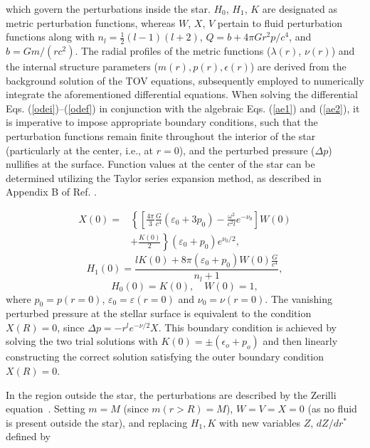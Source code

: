 \documentclass[aps,prd,twocolumn,superscriptaddress,footinbib]{revtex4-1}
\begin{document}
which govern the perturbations inside the star.  $H_0$, $H_1$, $K$ are designated as metric perturbation functions, whereas $W$, $X$, $V$ pertain to fluid perturbation functions along with $n_l= \frac{1}{2}\left(l-1\right)\left(l+2\right)$, $Q = b + 4 \pi G r^2 p/c^4$, and $b = G m/(r c^2)$. The radial profiles of the metric functions ($\lambda(r)$, $\nu(r)$) and the internal structure parameters ($m(r),p(r),\epsilon(r)$) are derived from the background solution of the TOV equations, subsequently employed to numerically integrate the aforementioned differential equations. When solving the differential Eqs. (\ref{odei})–(\ref{odef}) in conjunction with the algebraic Eqs. (\ref{ae1}) and (\ref{ae2}), it is imperative to impose appropriate boundary conditions, such that the perturbation functions remain finite throughout the interior of the star (particularly at the center, i.e., at \( r = 0 \)), and the perturbed pressure (\(\Delta p\)) nullifies at the surface. Function values at the center of the star can be determined utilizing the Taylor series expansion method, as described in Appendix B of Ref. \cite{lindblom1983quadrupole}.

\begin{equation}
\begin{aligned}
X(0) =& \left\{\left[\frac{4 \pi}{3} \frac{G}{c^4} \left(\varepsilon_{0}+3 p_{0}\right)-\frac{\omega^{2}}{c^2 l} e^{-\nu_{0}}\right] W(0)\right. \\ & \left.+\frac{K(0)}{2}\right\}\left(\varepsilon_{0}+p_{0}\right) e^{\nu_{0} / 2} ,
\end{aligned}
\end{equation}
\begin{equation}
H_{1}(0)=\frac{l K(0)+8 \pi\left(\varepsilon_{0}+p_{0}\right) W(0)\frac{G}{c^4}}{n_{l}+1} ,
\end{equation}
\begin{equation}
H_0(0) =  K(0) , \quad W(0)=  1 ,
\end{equation}
where $p_0= p(r=0)$, $\varepsilon_0= \varepsilon(r=0)$ and $\nu_0= \nu(r=0)$. The vanishing perturbed pressure at the stellar surface is equivalent to the condition \( X(R) = 0 \), since \(\Delta p = -r^l e^{-\nu/2} X\). This boundary condition is achieved by solving the two trial solutions with $K(0)=\pm (\epsilon_o + p_o)$ and then linearly constructing the correct solution satisfying the outer boundary condition \( X(R) = 0 \).

In the region outside the star, the perturbations are described by the Zerilli equation~\cite{1971}. Setting $m=M$ (since $m(r>R)=M$), $W=V=X=0$ (as no fluid is present outside the star), and replacing $H_1,K$ with new variables $Z$, $dZ/dr^*$ defined by
\end{document}

